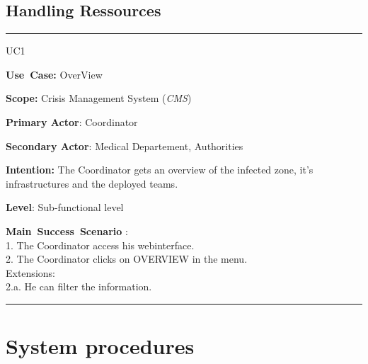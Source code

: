 \subsection{Handling Ressources}
\vspace{0.5cm}
\hrule
\vspace{0.5cm}
\begin{lyxlist}{UC1}
\small{
\item [\textbf{Use~Case:}] OverView
\item [\textbf{Scope:}] Crisis Management System (\emph{CMS})
\item [\textbf{Primary Actor}:] Coordinator
\item [\textbf{Secondary Actor}:] Medical Departement, Authorities
\item [\textbf{Intention:}] The Coordinator gets an overview of the infected
zone, it's infrastructures and the deployed teams.
\item [\textbf{Level}:]Sub-functional level
\item [\textbf{Main~Success~Scenario}]:\\
1. The Coordinator access his webinterface.\\
2. The Coordinator clicks on OVERVIEW in the menu.\\
Extensions:\\
	2.a. He can filter the information.\\

}
\end{lyxlist}
\hrule
\vspace{0.5cm} 

\section{System procedures}

